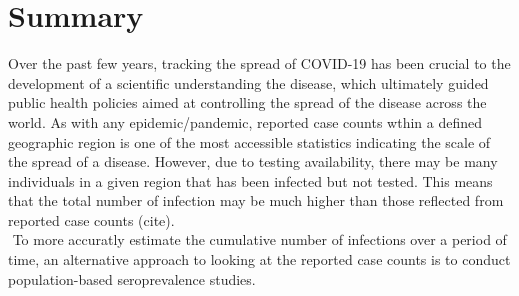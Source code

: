 \section{Summary}
Over the past few years, tracking the spread of COVID-19 has been crucial to the development of a scientific understanding the disease, which ultimately guided public health policies aimed at controlling the spread of the disease across the world. As with any epidemic/pandemic, reported case counts wthin a defined geographic region is one of the most accessible statistics indicating the scale of the spread of a disease. However, due to testing availability, there may be many individuals in a given region that has been infected but not tested. This means that the total number of infection may be much higher than those reflected from reported case counts (cite). \\
\newline$ $
To more accuratly estimate the cumulative number of infections over a period of time, an alternative approach to looking at the reported case counts is to conduct population-based seroprevalence studies. 